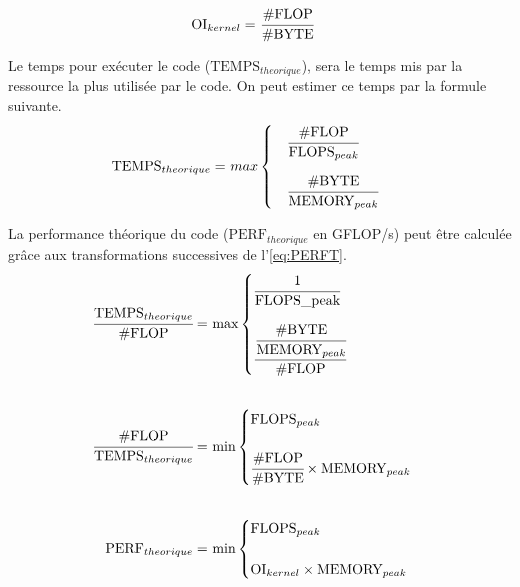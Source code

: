 \begin{equation}
\begin{aligned}
        \text{OI}_{kernel} =\ &\cfrac{\text{\#FLOP}}{\text{\#BYTE}}
\end{aligned}
\end{equation}

Le temps pour exécuter le code ($\text{TEMPS}_{theorique}$), sera le temps mis par la ressource la plus utilisée par le code. On peut estimer ce temps par la formule suivante.
\begin{equation}
\begin{aligned}
     \text{TEMPS}_{theorique} =\  &max 
     \begin{cases} 
        \quad \cfrac{\text{\#FLOP}}{\text{FLOPS}_{peak}}    \\[15pt]
        \quad \cfrac{\text{\#BYTE}}{\text{MEMORY}_{peak}}
    \end{cases}
\end{aligned}
\end{equation}




La performance théorique du code ($\text{PERF}_{theorique}$ en GFLOP/s) peut être calculée grâce aux transformations successives de l'\autoref{eq:PERFT}.
\begin{equation}
\begin{aligned}
\label{eq:PERFT}
\cfrac{\text{TEMPS}_{theorique}}{\text{\#FLOP}}  =\ &\text{max}
\begin{cases} 
    \cfrac {1}{\text{FLOPS\_{peak}}}    \\[15pt]  
    \cfrac {\cfrac{\text{\#BYTE}}{\text{MEMORY}_{peak}}}{\text{\#FLOP}} 
\end{cases}\\[20pt]
\cfrac{\text{\#FLOP}}{\text{TEMPS}_{theorique}}  =\ &\text{min}
\begin{cases} 
    \text{FLOPS}_{peak}    \\[15pt]  
    \cfrac{\text{\#FLOP}}{\text{\#BYTE}} \times \text{MEMORY}_{peak}
\end{cases}\\[20pt]
\text{PERF}_{theorique}  =\ &\text{min}
\begin{cases} 
    \text{FLOPS}_{peak}    \\[15pt]  
    \text{OI}_{kernel} \times \text{MEMORY}_{peak} 
\end{cases}
\end{aligned}
\end{equation}



